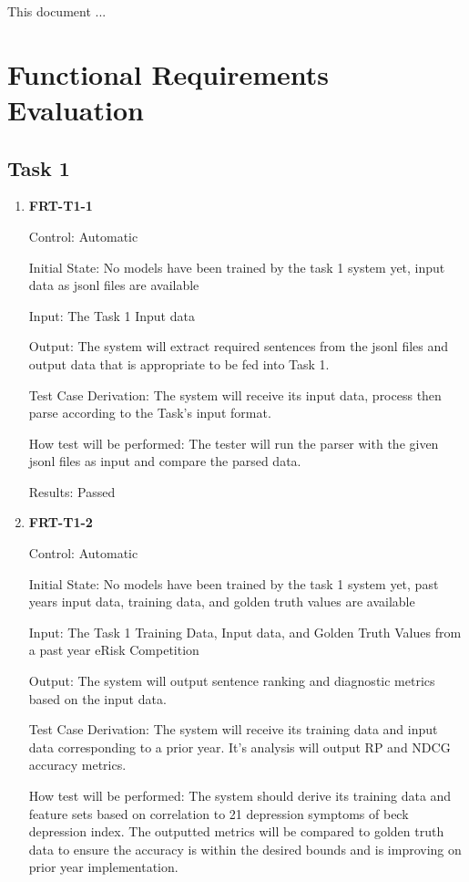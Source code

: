 \documentclass[12pt, titlepage]{article}
\begin{document}
\listoffigures %

\newpage


This document ...

\section{Functional Requirements Evaluation}
\subsection{Task 1}

\begin{enumerate}
\item \textbf{FRT-T1-1}

Control: Automatic

Initial State: No models have been trained by the task 1 system yet, input data as jsonl files are available

Input: The Task 1 Input data

Output: The system will extract required sentences from the jsonl files and output data that is appropriate to be fed into Task 1.

Test Case Derivation: The system will receive its input data, process then parse according to the Task's input format.

How test will be performed: The tester will run the parser with the given jsonl files as input and compare the parsed data.

Results: Passed

\item \textbf{FRT-T1-2}

Control: Automatic

Initial State: No models have been trained by the task 1 system yet, past years input data, training data, and golden truth values are available

Input: The Task 1 Training Data, Input data, and Golden Truth Values from a past year eRisk Competition

Output: The system will output sentence ranking and diagnostic metrics based on the input data. 

Test Case Derivation: The system will receive its training data and input data corresponding to a prior year. It's analysis will output RP and NDCG accuracy metrics.

How test will be performed: The system should derive its training data and feature sets based on correlation to 21 depression symptoms of beck depression index. The outputted metrics will be compared to golden truth data to ensure the accuracy is within the desired bounds and is improving on prior year implementation.


\end{enumerate}
\end{document}
